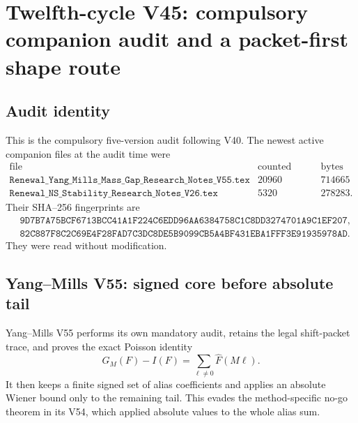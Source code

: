 \documentclass[11pt]{article}
\theoremstyle{remark}
\begin{document}

\section{Twelfth-cycle V45: compulsory companion audit and a
packet-first shape route}
\label{sec:v12v45}

\subsection{Audit identity}

This is the compulsory five-version audit following V40.  The newest
active companion files at the audit time were
\[
\begin{array}{c|r|r}
\text{file}&\text{counted lines}&\text{bytes}\\ \hline
\texttt{Renewal\_Yang\_Mills\_Mass\_Gap\_Research\_Notes\_V55.tex}
 &20960&714665\\
\texttt{Renewal\_NS\_Stability\_Research\_Notes\_V26.tex}
 &5320&278283.
\end{array}                                                   \tag{45.1}
\]
Their SHA--256 fingerprints are
\[
\begin{split}
 &\texttt{9D7B7A75BCF6713BCC41A1F224C6EDD96AA6384758C1C8DD3274701A9C1EF207},
 \\
 &\texttt{82C887F8C2C69E4F28FAD7C3DC8DE5B9099CB5A4BF431EBA1FFF3E91935978AD}.
\end{split}                                                   \tag{45.2}
\]
They were read without modification.

\subsection{Yang--Mills V55: signed core before absolute tail}

Yang--Mills V55 performs its own mandatory audit, retains the legal
shift-packet trace, and proves the exact Poisson identity
\[
 G_M(F)-I(F)
 =
 \sum_{\ell\ne0}\widehat F(M\ell).
\]
It then keeps a finite signed set of alias coefficients and applies
an absolute Wiener bound only to the remaining tail.  This evades
the method-specific no-go theorem in its V54, which applied absolute
values to the whole alias sum.
\end{document}
